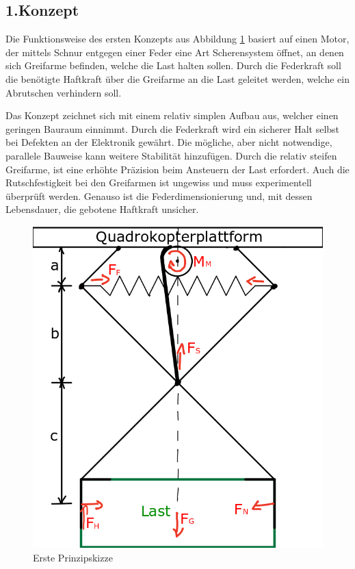 \subsection{1.Konzept}
Die Funktionsweise des ersten Konzepts aus Abbildung \ref{erste_prinzipskizze} basiert auf einen Motor, der mittels Schnur entgegen einer Feder eine Art Scherensystem öffnet, an denen sich Greifarme befinden, welche die Last halten sollen. Durch die Federkraft soll die benötigte Haftkraft über die Greifarme an die Last geleitet werden, welche ein Abrutschen verhindern soll.
\par
Das Konzept zeichnet sich mit einem relativ simplen Aufbau aus, welcher einen geringen Bauraum einnimmt. Durch die Federkraft wird ein sicherer Halt selbst bei Defekten an der Elektronik gewährt. Die mögliche, aber nicht notwendige, parallele Bauweise kann weitere Stabilität hinzufügen.
Durch die relativ steifen Greifarme, ist eine erhöhte Präzision beim Ansteuern der Last erfordert. Auch die Rutschfestigkeit bei den Greifarmen ist ungewiss und muss experimentell überprüft werden.
Genauso ist die Federdimensionierung und, mit dessen Lebensdauer, die gebotene Haftkraft unsicher.
\begin{figure}[h]
	\begin{center}
	\includegraphics[scale=0.5]{"Grafiken/Skizze1mechanik.png"}
	\caption{Erste Prinzipskizze}
	\label{erste_prinzipskizze}
	\end{center}
\end{figure}

